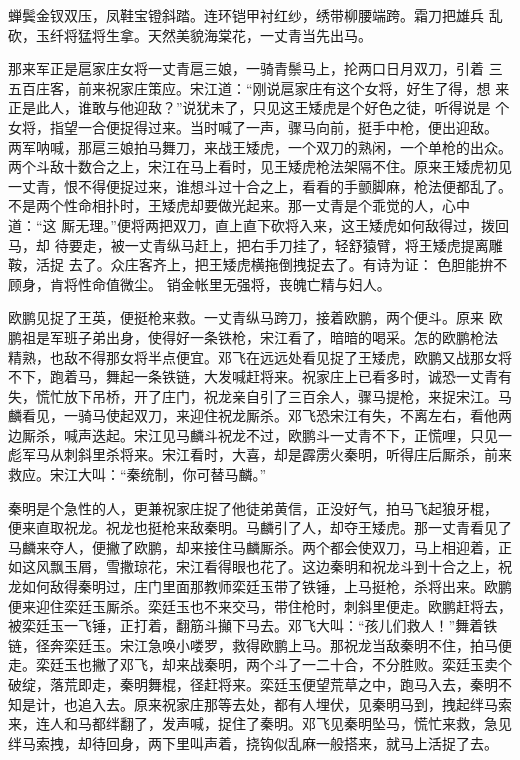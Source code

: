 蝉鬓金钗双压，凤鞋宝镫斜踏。连环铠甲衬红纱，绣带柳腰端跨。霜刀把雄兵
乱砍，玉纤将猛将生拿。天然美貌海棠花，一丈青当先出马。

那来军正是扈家庄女将一丈青扈三娘，一骑青鬃马上，抡两口日月双刀，引着
三五百庄客，前来祝家庄策应。宋江道：“刚说扈家庄有这个女将，好生了得，想
来正是此人，谁敢与他迎敌？”说犹未了，只见这王矮虎是个好色之徒，听得说是
个女将，指望一合便捉得过来。当时喊了一声，骤马向前，挺手中枪，便出迎敌。
两军呐喊，那扈三娘拍马舞刀，来战王矮虎，一个双刀的熟闲，一个单枪的出众。
两个斗敌十数合之上，宋江在马上看时，见王矮虎枪法架隔不住。原来王矮虎初见
一丈青，恨不得便捉过来，谁想斗过十合之上，看看的手颤脚麻，枪法便都乱了。
不是两个性命相扑时，王矮虎却要做光起来。那一丈青是个乖觉的人，心中道：“这
厮无理。”便将两把双刀，直上直下砍将入来，这王矮虎如何敌得过，拨回马，却
待要走，被一丈青纵马赶上，把右手刀挂了，轻舒猿臂，将王矮虎提离雕鞍，活捉
去了。众庄客齐上，把王矮虎横拖倒拽捉去了。有诗为证：
色胆能拚不顾身，肯将性命值微尘。
销金帐里无强将，丧魄亡精与妇人。

欧鹏见捉了王英，便挺枪来救。一丈青纵马跨刀，接着欧鹏，两个便斗。原来
欧鹏祖是军班子弟出身，使得好一条铁枪，宋江看了，暗暗的喝采。怎的欧鹏枪法
精熟，也敌不得那女将半点便宜。邓飞在远远处看见捉了王矮虎，欧鹏又战那女将
不下，跑着马，舞起一条铁链，大发喊赶将来。祝家庄上已看多时，诚恐一丈青有
失，慌忙放下吊桥，开了庄门，祝龙亲自引了三百余人，骤马提枪，来捉宋江。马
麟看见，一骑马使起双刀，来迎住祝龙厮杀。邓飞恐宋江有失，不离左右，看他两
边厮杀，喊声迭起。宋江见马麟斗祝龙不过，欧鹏斗一丈青不下，正慌哩，只见一
彪军马从刺斜里杀将来。宋江看时，大喜，却是霹雳火秦明，听得庄后厮杀，前来
救应。宋江大叫：“秦统制，你可替马麟。”

秦明是个急性的人，更兼祝家庄捉了他徒弟黄信，正没好气，拍马飞起狼牙棍，
便来直取祝龙。祝龙也挺枪来敌秦明。马麟引了人，却夺王矮虎。那一丈青看见了
马麟来夺人，便撇了欧鹏，却来接住马麟厮杀。两个都会使双刀，马上相迎着，正
如这风飘玉屑，雪撒琼花，宋江看得眼也花了。这边秦明和祝龙斗到十合之上，祝
龙如何敌得秦明过，庄门里面那教师栾廷玉带了铁锤，上马挺枪，杀将出来。欧鹏
便来迎住栾廷玉厮杀。栾廷玉也不来交马，带住枪时，刺斜里便走。欧鹏赶将去，
被栾廷玉一飞锤，正打着，翻筋斗攧下马去。邓飞大叫：“孩儿们救人！”舞着铁
链，径奔栾廷玉。宋江急唤小喽罗，救得欧鹏上马。那祝龙当敌秦明不住，拍马便
走。栾廷玉也撇了邓飞，却来战秦明，两个斗了一二十合，不分胜败。栾廷玉卖个
破绽，落荒即走，秦明舞棍，径赶将来。栾廷玉便望荒草之中，跑马入去，秦明不
知是计，也追入去。原来祝家庄那等去处，都有人埋伏，见秦明马到，拽起绊马索
来，连人和马都绊翻了，发声喊，捉住了秦明。邓飞见秦明坠马，慌忙来救，急见
绊马索拽，却待回身，两下里叫声着，挠钩似乱麻一般搭来，就马上活捉了去。

